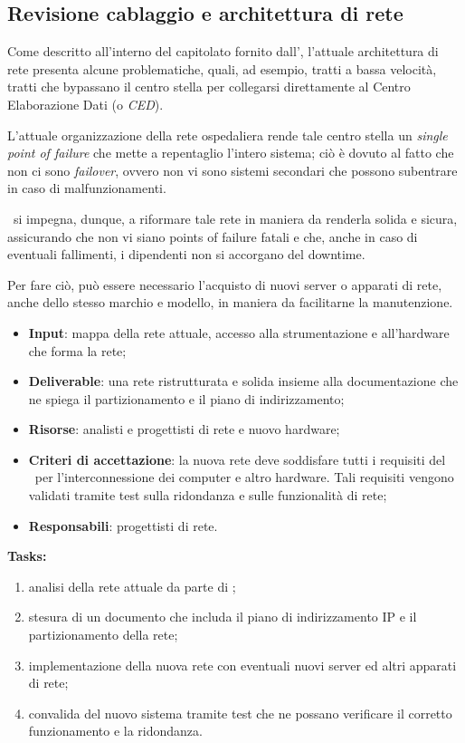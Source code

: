 	\subsection{Revisione cablaggio e architettura di rete}\label{subsec:revisione_rete}
	
		Come descritto all'interno del capitolato fornito dall'\istituto, l'attuale architettura di rete presenta alcune problematiche, quali, ad esempio, tratti a bassa velocità, tratti che bypassano il centro stella per collegarsi direttamente al Centro Elaborazione Dati (o \textit{CED}).

		L'attuale organizzazione della rete ospedaliera rende tale centro stella un \textit{single point of failure} che mette a repentaglio l'intero sistema; ciò è dovuto al fatto che non ci sono \textit{failover}, ovvero non vi sono sistemi secondari che possono subentrare in caso di malfunzionamenti.
		
		\azienda~si impegna, dunque, a riformare tale rete in maniera da renderla solida e sicura, assicurando che non vi siano points of failure fatali e che, anche in caso di eventuali fallimenti, i dipendenti non si accorgano del downtime.
	
		Per fare ciò, può essere necessario l'acquisto di nuovi server o apparati di rete, anche dello stesso marchio e modello, in maniera da facilitarne la manutenzione.
	
		\begin{itemize}[noitemsep]
			\renewcommand\labelitemi{--}
			\item \textbf{Input}: mappa della rete attuale, accesso alla strumentazione e all'hardware che forma la rete;
			\item \textbf{Deliverable}: una rete ristrutturata e solida insieme alla documentazione che ne spiega il partizionamento e il piano di indirizzamento; 
			\item \textbf{Risorse}: analisti e progettisti di rete e nuovo hardware;
			\item \textbf{Criteri di accettazione}: la nuova rete deve soddisfare tutti i requisiti del \proponente~per l'interconnessione dei computer e altro hardware. Tali requisiti vengono validati tramite test sulla ridondanza e sulle funzionalità di rete;
			\item \textbf{Responsabili}: progettisti di rete.
		\end{itemize}
		
		\textbf{Tasks:}
		\begin{enumerate}[noitemsep]
			\item analisi della rete attuale da parte di \azienda;
			\item stesura di un documento che includa il piano di indirizzamento IP e il partizionamento della rete;
			\item implementazione della nuova rete con eventuali nuovi server ed altri apparati di rete;
			\item convalida del nuovo sistema tramite test che ne possano verificare il corretto funzionamento e la ridondanza.
		\end{enumerate}

